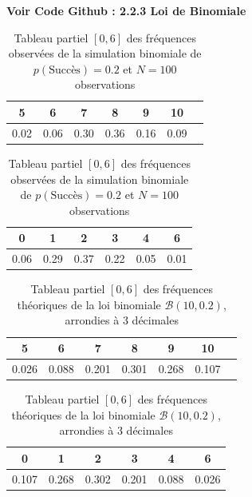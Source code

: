   \textbf{Voir Code Github \cite{git} : 2.2.3 Loi de Binomiale}
    \begin{table}[H]
      \centering
      \begin{minipage}{0.45\textwidth}
      \centering
      \begin{tabular}{c c c c c c c}
        \toprule
        5 & 6 & 7 & 8 & 9 & 10 \\
        \midrule
        0.02 & 0.06 & 0.30 & 0.36 & 0.16 & 0.09 \\
        \bottomrule
      \end{tabular}
      \caption{Tableau partiel $[5,10]$ des fréquences observées de la simulation binomiale de $p(\text{Succès})=0.8$ et $N=100$ observations}
      \label{tab:binomiale_1}
      \end{minipage}
      \hfill
      \begin{minipage}{0.45\textwidth}
      \centering
      \begin{tabular}{c c c c c c }
        \toprule
        0 & 1 & 2 & 3 & 4 & 6 \\
        \midrule
        0.06 & 0.29 & 0.37 & 0.22 & 0.05 & 0.01 \\
        \bottomrule
      \end{tabular}
      \caption{Tableau partiel $[0,6]$ des fréquences observées de la simulation binomiale de $p(\text{Succès})=0.2$ et $N=100$ observations}
      \label{tab:binomiale_2}
      \end{minipage}
    \end{table}

    \begin{table}[H]
      \centering
      \begin{minipage}{0.45\textwidth}
        \centering
          \begin{tabular}{c c c c c c c}
            \toprule
            5 & 6 & 7 & 8 & 9 & 10 \\
            \midrule
            0.026 & 0.088 & 0.201 & 0.301 & 0.268 & 0.107 \\
            \bottomrule
          \end{tabular}
          \caption{Tableau partiel $[5,10]$ des fréquences théoriques de la loi binomiale $\mathcal{B}(10, 0.8)$, arrondies à 3 décimales}
          \label{tab:binomiale_3}
      \end{minipage}
      \hfill
      \begin{minipage}{0.45\textwidth}
        \centering
        \begin{tabular}{c c c c c c }
          \toprule
          0 & 1 & 2 & 3 & 4 & 6 \\
          \midrule
          0.107 & 0.268 & 0.302 & 0.201 & 0.088 & 0.026 \\
          \bottomrule
        \end{tabular}
        \caption{Tableau partiel $[0,6]$ des fréquences théoriques de la loi binomiale $\mathcal{B}(10, 0.2)$, arrondies à 3 décimales}
        \label{tab:binomiale_4}
      \end{minipage}
    \end{table}

